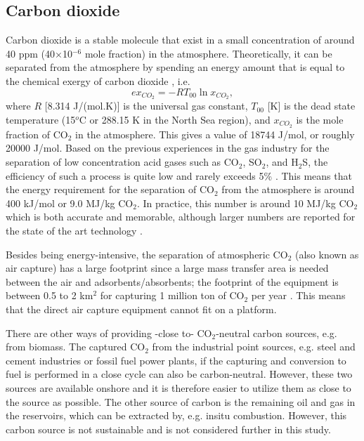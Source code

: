 \documentclass{ECOS_2021}
\begin{document}
\sffamily \subsection{Carbon dioxide}
\normalsize
Carbon dioxide is a stable molecule that exist in a small concentration
of around 40 ppm (40$\times$10$^{-6}$ mole fraction) in the atmosphere.
Theoretically, it can be separated from the atmosphere by spending
an energy amount that is equal to the chemical exergy of carbon dioxide
\cite{sankaranarayananEfficiencySustainabilityEnergy2010}, i.e.
\[
ex_{CO_{2}}=-RT_{00}\ln x_{CO_{2}},
\]
where $R$ {[}8.314 J/(mol.K){]} is the universal gas constant, $T_{00}$
{[}K{]} is the dead state temperature (15$^{o}$C or 288.15 K in the
North Sea region), and $x_{CO_{2}}$ is the mole fraction of CO$_{2}$
in the atmosphere. This gives a value of 18744 J/mol, or roughly 20000
J/mol. Based on the previous experiences in the gas industry for the
separation of low concentration acid gases such as CO$_{2}$, SO$_{2}$,
and H$_{2}$S, the efficiency of such a process is quite low and rarely
exceeds 5\% \cite{keithWhyCaptureCO22009a,mahmoudkhaniLowenergySodiumHydroxide2009}.
This means that the energy requirement for the separation of CO$_{2}$
from the atmosphere is around 400 kJ/mol or 9.0 MJ/kg CO$_{2}$. In
practice, this number is around 10 MJ/kg CO$_{2}$ which is both accurate
and memorable, although larger numbers are reported for the state
of the art technology \cite{internationalenergyagencyDirectAirCapture}.

Besides being energy-intensive, the separation of atmospheric CO$_{2}$
(also known as air capture) has a large footprint since a large mass
transfer area is needed between the air and adsorbents/absorbents;
the footprint of the equipment is between 0.5 to 2 km$^{2}$ for capturing
1 million ton of CO$_{2}$ per year \cite{DirectAirCapture2021,mcqueenCostAnalysisDirect2020}.
This means that the direct air capture equipment cannot fit on a platform.

There are other ways of providing -close to- CO$_{2}$-neutral carbon
sources, e.g. from biomass. The captured CO$_{2}$ from the industrial
point sources, e.g. steel and cement industries or fossil fuel power
plants, if the capturing and conversion to fuel is performed in a
close cycle can also be carbon-neutral. However, these two sources
are available onshore and it is therefore easier to utilize them as
close to the source as possible. The other source of carbon is the
remaining oil and gas in the reservoirs, which can be extracted by,
e.g. insitu combustion. However, this carbon source is not sustainable
and is not considered further in this study. 
\end{document}
